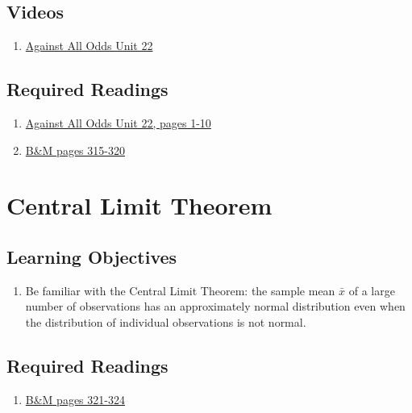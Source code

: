\documentclass[letterpaper,9pt,twocolumn,twoside,printwatermark=false]{pinp}
\providecommand{\tightlist}{%
  \setlength{\itemsep}{0pt}\setlength{\parskip}{0pt}}
\begin{document}
\subsection{Videos}\label{videos}

\begin{enumerate}
\def\labelenumi{\arabic{enumi}.}
\tightlist
\item
  \href{https://www.learner.org/courses/againstallodds/unitpages/unit22.html}{Against
  All Odds Unit 22}
\end{enumerate}

\subsection{Required Readings}\label{required-readings-1}

\begin{enumerate}
\item \href{https://www.learner.org/courses/againstallodds/pdfs/AgainstAllOdds_StudentGuide_Unit22.pdf#page=1}{Against All Odds Unit 22, pages 1-10}
\item \href{https://www.dropbox.com/s/8u0j9lupv5pxqpm/Ch13SamplingDistributions.pdf?dl=0}{B\&M pages 315-320}
\end{enumerate}

\vspace*{0.5cm}

\section{Central Limit Theorem}\label{central-limit-theorem}

\subsection{Learning Objectives}\label{learning-objectives-2}

\begin{enumerate}
\def\labelenumi{\arabic{enumi}.}
\tightlist
\item
  Be familiar with the Central Limit Theorem: the sample mean
  \(\bar{x}\) of a large number of observations has an approximately
  normal distribution even when the distribution of individual
  observations is not normal.
\end{enumerate}

\subsection{Required Readings}\label{required-readings-2}

\begin{enumerate}
\def\labelenumi{\arabic{enumi}.}
\tightlist
\item
  \href{https://www.dropbox.com/s/8u0j9lupv5pxqpm/Ch13SamplingDistributions.pdf?dl=0}{B\&M
  pages 321-324}
\end{enumerate}





\end{document}
